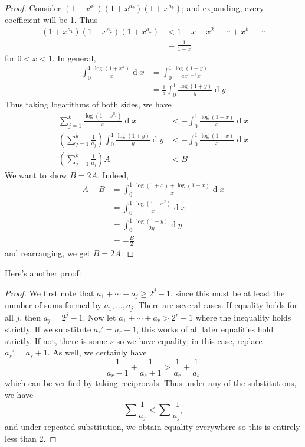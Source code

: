 \documentclass[12pt, a4paper]{book}
\renewcommand{\d}[1]{\ensuremath{\operatorname{d}\!{#1}}} %
\theoremstyle{nonumberplain}
\newtheorem{proof}{Proof}
\begin{document}
\begin{proof}
    Consider $(1+x^{a_1})(1+x^{a_2})(1+x^{a_k})$; and expanding, every coefficient will be 1.
    Thus
    \begin{align*}
        (1+x^{a_1})(1+x^{a_2})(1+x^{a_k}) &< 1+x+x^2+\cdots+x^k+\cdots\\
                                          &= \frac{1}{1-x}
    \end{align*}
    for $0<x<1$.
    In general,
    \begin{align*}
        \int_0^1\frac{\log(1+x^a)}{x}\d{x}&=\int_0^1\frac{\log(1+y)}{ax^{a-1}x}\\
                                          &= \frac{1}{a}\int_0^1\frac{\log(1+y)}{y}\d{y}
    \end{align*}
    Thus taking logarithms of both sides, we have
    \begin{align*}
        \sum\limits_{j=1}^k\frac{\log(1+x^{a_j})}{x}\d{x} &< -\int_0^1\frac{\log(1-x)}{x}\d{x}\\
        \left(\sum\limits_{j=1}^k\frac{1}{a_j}\right)\int_0^1\frac{\log(1+y)}{y}\d{y}&<-\int_0^1\frac{\log(1-x)}{x}\d{x}\\
        \left(\sum\limits_{j=1}^k\frac{1}{a_j}\right)A&<B
    \end{align*}
    We want to show $B=2A$.
    Indeed,
    \begin{align*}
        A-B &= \int_0^1\frac{\log(1+x)+\log(1-x)}{x}\d{x}\\
            &= \int_0^1\frac{\log(1-x^2)}{x}\d{x}\\
            &= \int_0^1\frac{\log(1-y)}{2y}\d{y}\\
            &=-\frac{B}{2}
    \end{align*}
    and rearranging, we get $B=2A$.
\end{proof}
Here's another proof:
\begin{proof}
    We first note that $a_1+\cdots+a_j\geq 2^j-1$, since this must be at least the number of sums formed by $a_1,\ldots,a_j$.
    There are several cases.
    If equality holds for all $j$, then $a_j=2^j-1$.
    Now let $a_1+\cdots+a_r>2^r-1$ where the inequality holds strictly.
    If we substitute $a_r'=a_r-1$, this works of all later equalities hold strictly.
    If not, there is some $s$ so we have equality; in this case, replace $a_s'=a_s+1$.
    As well, we certainly have
    \[\frac{1}{a_r-1}+\frac{1}{a_s+1}>\frac{1}{a_r}+\frac{1}{a_s}\]
    which can be verified by taking reciprocals.
    Thus under any of the substitutions, we have
    \[\sum\frac{1}{a_j}<\sum\frac{1}{a_j'}\]
    and under repeated substitution, we obtain equality everywhere so this is entirely less than 2.
\end{proof}
\end{document}
